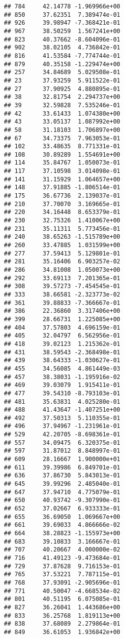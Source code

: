 \documentclass[
]{article}
\begin{document}
\begin{verbatim}
## 784     42.14778 -1.969966e+00
## 850     37.62351  7.389474e-01
## 926     39.98947 -7.368421e-01
## 967     38.50259  1.567241e+00
## 823     40.37662 -8.604096e-01
## 902     38.02105  4.736842e-01
## 816     41.53584 -7.774744e-01
## 879     40.35158 -1.229474e+00
## 257     34.84689  5.029508e-01
## 23      37.93259  5.911522e-01
## 27      37.90925  4.880895e-01
## 38      32.81754  2.294737e+00
## 39      32.59828  7.535246e-01
## 42      33.61433  1.074380e+00
## 43      33.05137  1.087992e+00
## 58      31.18103  1.706897e+00
## 67      34.73375  7.963053e-01
## 102     33.48635  8.771331e-01
## 108     30.89289  1.554691e+00
## 114     35.84767  1.050073e-01
## 117     37.10598  3.014098e-01
## 141     31.15929  1.064657e+00
## 148     37.91885 -1.806514e-01
## 175     36.67736  2.139037e-01
## 210     37.70070  3.169665e-01
## 220     34.16448  8.653379e-01
## 230     32.75326  1.410067e+00
## 231     35.11311  5.773456e-01
## 240     38.65263 -1.515789e+00
## 260     33.47885  1.031599e+00
## 277     37.59413  5.129801e-01
## 281     35.16406  6.903257e-02
## 286     34.81008  1.050073e+00
## 292     33.69113  7.201365e-01
## 308     39.57273 -7.454545e-01
## 333     38.66581 -2.323773e-02
## 361     39.88833 -7.366667e-01
## 386     22.36860  3.317406e+00
## 399     28.66731  1.225085e+00
## 404     37.57803  4.696159e-01
## 405     32.04797  6.562956e-01
## 418     39.02123  1.215362e-01
## 431     38.59543 -2.368498e-01
## 439     38.64333 -1.030627e-01
## 455     34.56085  4.861449e-03
## 457     38.38031 -1.195916e-02
## 469     39.03079  1.915411e-01
## 477     39.54310 -8.793103e-01
## 481     35.63831  4.025280e-01
## 488     41.43647 -1.407251e+00
## 492     37.50313  5.110355e-01
## 496     37.94967 -1.231961e-01
## 529     42.20705 -8.698361e-01
## 557     34.09475  6.320375e-01
## 597     31.87012  8.848997e-01
## 609     28.16667  1.900000e+01
## 611     39.39986  6.849701e-01
## 636     37.86730  5.843013e-01
## 645     39.99296  2.485040e-01
## 647     37.94710  4.775079e-01
## 650     40.93742 -9.307990e-01
## 652     37.02667  6.933333e-01
## 655     36.69050  1.069667e+00
## 661     39.69033  4.866666e-02
## 664     38.28823 -1.155973e+00
## 683     39.10833  3.166667e-01
## 707     40.20667  4.000000e-02
## 716     41.49123 -9.473684e-01
## 729     37.87628  9.716153e-01
## 765     37.53221  7.787115e-01
## 768     37.93091 -2.905696e-01
## 771     40.50047 -4.668534e-02
## 801     40.51195  6.075085e-01
## 827     36.26041  1.443686e+00
## 833     36.25768  1.819113e+00
## 838     37.68089  2.279864e-01
## 849     36.61053  1.936842e+00

\end{verbatim}
\end{document}
